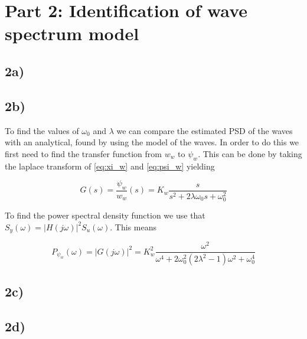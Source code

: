 
\section{Part 2: Identification of wave spectrum model}

\subsection{2a)}




\subsection{2b)}
To find the values of $\omega_0$ and $\lambda$ we can compare the estimated PSD of the waves with an analytical, found by using the model of the waves. In order to do this we first need to find the transfer function from $w_w$ to $\psi_w$. This can be done by taking the laplace transform of \cref{eq:xi_w} and \cref{eq:psi_w} yielding

\begin{equation}
    G(s) = \frac{\psi_w}{w_w}(s) = K_w\frac{s}{s^2+2\lambda\omega_0s+\omega_0^2} \label{eq:G(s)}
\end{equation}

To find the power spectral density function we use that $S_y(\omega) = |H(j\omega)|^2S_u(\omega)$. This means

\begin{equation}
    P_{\psi_w}(\omega) = |G(j\omega)|^2 = K_w^2\frac{\omega^2}{\omega^4+2\omega_0^2(2\lambda^2-1)\omega^2+\omega_0^4} \label{eq:PSD}
\end{equation}


\subsection{2c)}

\subsection{2d)}

